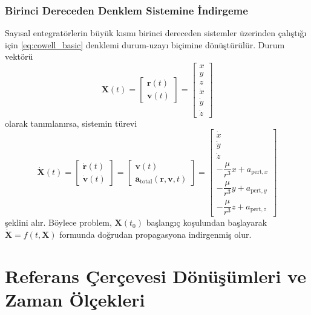 \subsubsection{Birinci Dereceden Denklem Sistemine İndirgeme}
\label{subsubsec:first_order_reduction}

Sayısal entegratörlerin büyük kısmı birinci dereceden sistemler üzerinden çalıştığı için
\eqref{eq:cowell_basic} denklemi durum-uzayı biçimine dönüştürülür. Durum vektörü
\begin{equation}
\mathbf X(t)=
\begin{bmatrix}
\mathbf r(t)\\
\mathbf v(t)
\end{bmatrix}
=
\begin{bmatrix}
x\\y\\z\\\dot x\\\dot y\\\dot z
\end{bmatrix}
\end{equation}
olarak tanımlanırsa, sistemin türevi
\begin{equation}
\label{eq:state_space}
\dot{\mathbf X}(t)=
\begin{bmatrix}
\dot{\mathbf r}(t)\\
\dot{\mathbf v}(t)
\end{bmatrix}
=
\begin{bmatrix}
\mathbf v(t)\\
\mathbf a_{\text{total}}(\mathbf r,\mathbf v,t)
\end{bmatrix}
=
\begin{bmatrix}
\dot x\\ \dot y\\ \dot z\\
-\dfrac{\mu}{r^3}x + a_{\text{pert},x}\\
-\dfrac{\mu}{r^3}y + a_{\text{pert},y}\\
-\dfrac{\mu}{r^3}z + a_{\text{pert},z}
\end{bmatrix}
\end{equation}
şeklini alır. Böylece problem, $\mathbf X(t_0)$ başlangıç koşulundan başlayarak $\dot{\mathbf X}=f(t,\mathbf X)$ formunda
doğrudan propagasyona indirgenmiş olur.


\section{Referans Çerçevesi Dönüşümleri ve Zaman Ölçekleri}
\label{sec:frame_transforms}

